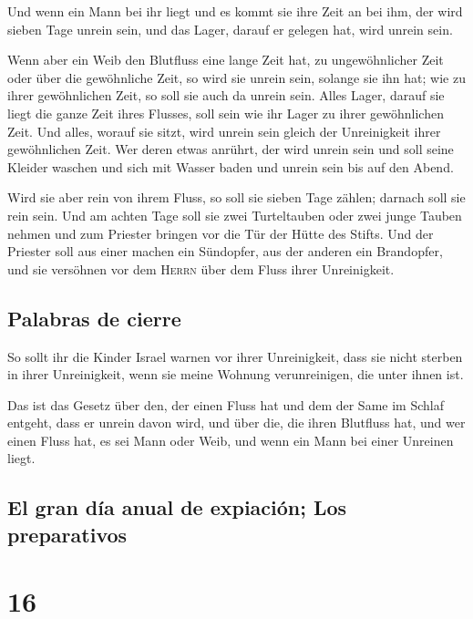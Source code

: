  Und wenn ein Mann bei ihr liegt und es kommt sie ihre
Zeit an bei ihm, der wird sieben Tage unrein sein, und das Lager, darauf
er gelegen hat, wird unrein sein.

 Wenn aber ein Weib den Blutfluss eine lange Zeit hat, zu
ungewöhnlicher Zeit oder über die gewöhnliche Zeit, so wird sie unrein
sein, solange sie ihn hat; wie zu ihrer gewöhnlichen Zeit, so soll sie
auch da unrein sein.  Alles Lager, darauf sie liegt die
ganze Zeit ihres Flusses, soll sein wie ihr Lager zu ihrer gewöhnlichen
Zeit. Und alles, worauf sie sitzt, wird unrein sein gleich der
Unreinigkeit ihrer gewöhnlichen Zeit.  Wer deren etwas
anrührt, der wird unrein sein und soll seine Kleider waschen und sich
mit Wasser baden und unrein sein bis auf den Abend.

 Wird sie aber rein von ihrem Fluss, so soll sie sieben
Tage zählen; darnach soll sie rein sein.  Und am achten
Tage soll sie zwei Turteltauben oder zwei junge Tauben nehmen und zum
Priester bringen vor die Tür der Hütte des Stifts.  Und
der Priester soll aus einer machen ein Sündopfer, aus der anderen ein
Brandopfer, und sie versöhnen vor dem \textsc{Herrn} über dem Fluss
ihrer Unreinigkeit.

\hypertarget{palabras-de-cierre}{%
\subsection{Palabras de cierre}\label{palabras-de-cierre}}

 So sollt ihr die Kinder Israel warnen vor ihrer
Unreinigkeit, dass sie nicht sterben in ihrer Unreinigkeit, wenn sie
meine Wohnung verunreinigen, die unter ihnen ist.

 Das ist das Gesetz über den, der einen Fluss hat und dem
der Same im Schlaf entgeht, dass er unrein davon wird, 
und über die, die ihren Blutfluss hat, und wer einen Fluss hat, es sei
Mann oder Weib, und wenn ein Mann bei einer Unreinen liegt.

\hypertarget{el-gran-duxeda-anual-de-expiaciuxf3n-los-preparativos}{%
\subsection{El gran día anual de expiación; Los
preparativos}\label{el-gran-duxeda-anual-de-expiaciuxf3n-los-preparativos}}

\hypertarget{section-15}{%
\section{16}\label{section-15}}

